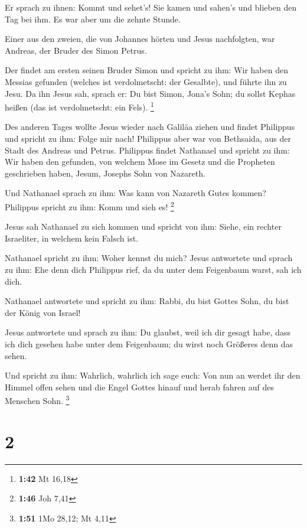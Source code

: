  Er sprach zu ihnen: Kommt und sehet's! Sie kamen und
sahen's und blieben den Tag bei ihm. Es war aber um die zehnte Stunde.

 Einer aus den zweien, die von Johannes hörten und Jesus
nachfolgten, war Andreas, der Bruder des Simon Petrus.

 Der findet am ersten seinen Bruder Simon und spricht zu
ihm: Wir haben den Messias gefunden (welches ist verdolmetscht: der
Gesalbte),  und führte ihn zu Jesu. Da ihn Jesus sah,
sprach er: Du bist Simon, Jona's Sohn; du sollst Kephas heißen (das ist
verdolmetscht: ein Fels). \footnote{\textbf{1:42} Mt 16,18}

 Des anderen Tages wollte Jesus wieder nach Galiläa
ziehen und findet Philippus und spricht zu ihm: Folge mir nach!
 Philippus aber war von Bethsaida, aus der Stadt des
Andreas und Petrus.  Philippus findet Nathanael und
spricht zu ihm: Wir haben den gefunden, von welchem Mose im Gesetz und
die Propheten geschrieben haben, Jesum, Josephs Sohn von Nazareth.

 Und Nathanael sprach zu ihm: Was kann von Nazareth Gutes
kommen? Philippus spricht zu ihm: Komm und sieh es! \footnote{\textbf{1:46}
  Joh 7,41}

 Jesus sah Nathanael zu sich kommen und spricht von ihm:
Siehe, ein rechter Israeliter, in welchem kein Falsch ist.

 Nathanael spricht zu ihm: Woher kennst du mich? Jesus
antwortete und sprach zu ihm: Ehe denn dich Philippus rief, da du unter
dem Feigenbaum warst, sah ich dich.

 Nathanael antwortete und spricht zu ihm: Rabbi, du bist
Gottes Sohn, du bist der König von Israel!

 Jesus antwortete und sprach zu ihm: Du glaubst, weil ich
dir gesagt habe, dass ich dich gesehen habe unter dem Feigenbaum; du
wirst noch Größeres denn das sehen.

 Und spricht zu ihm: Wahrlich, wahrlich ich sage euch:
Von nun an werdet ihr den Himmel offen sehen und die Engel Gottes hinauf
und herab fahren auf des Menschen Sohn. \footnote{\textbf{1:51} 1Mo
  28,12; Mt 4,11}

\hypertarget{section-1}{%
\section{2}\label{section-1}}

